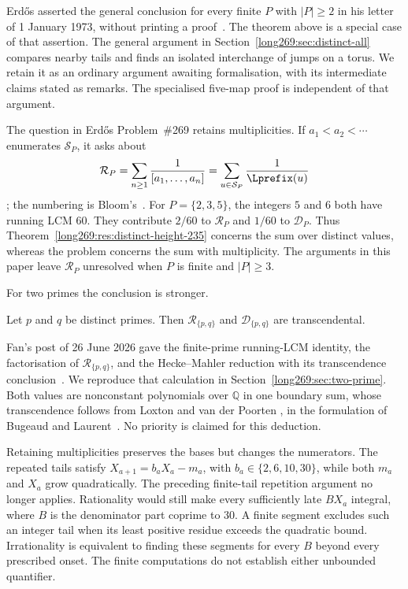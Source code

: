 Erd\H{o}s asserted the general conclusion for every finite $P$ with
$|P|\ge2$ in his letter of 1 January 1973, without printing a
proof~\cite[p.~335]{erdos1974letter}. The theorem above is a special case
of that assertion. The general argument in
Section~\ref{long269:sec:distinct-all} compares nearby tails and finds an
isolated interchange of jumps on a torus. We retain it as an ordinary
argument awaiting formalisation, with its intermediate claims stated as
remarks. The specialised five-map proof is independent of that argument.

The question in Erd\H{o}s Problem~\#269 retains multiplicities. If
$a_1<a_2<\cdots$ enumerates $\mathcal S_P$, it asks about
\[
 \mathcal R_P=\sum_{n\ge1}\frac1{[a_1,\ldots,a_n]}
             =\sum_{u\in\mathcal S_P}\frac1{\Lprefix(u)}
\]
\cite[p.~65]{erdosgraham1980}\cite[p.~106]{erdos1988}; the numbering is
Bloom's~\cite{erdosproblems}. For $P=\{2,3,5\}$, the integers $5$ and $6$
both have running LCM $60$. They contribute $2/60$ to $\mathcal R_P$ and
$1/60$ to $\mathcal D_P$. Thus Theorem~\ref{long269:res:distinct-height-235}
concerns the sum over distinct values, whereas the problem concerns
the sum with multiplicity. The arguments in this paper leave
$\mathcal R_P$ unresolved when $P$ is finite and $|P|\ge3$.

For two primes the conclusion is stronger.

\begin{theorem}\label{long269:res:lead-two-prime}
Let $p$ and $q$ be distinct primes.  Then $\mathcal R_{\{p,q\}}$ and
$\mathcal D_{\{p,q\}}$ are transcendental.
\end{theorem}

Fan's post of 26 June 2026 gave the finite-prime running-LCM identity,
the factorisation of $\mathcal R_{\{p,q\}}$, and the Hecke--Mahler reduction
with its transcendence conclusion~\cite{fan2026comment}. We reproduce that
calculation in Section~\ref{long269:sec:two-prime}. Both values are
nonconstant polynomials over $\mathbb Q$ in one boundary sum, whose
transcendence follows from Loxton and van der Poorten
\cite[Theorem~8, p.~40]{loxtonvdp1977}, in the formulation of Bugeaud and
Laurent~\cite[Theorem~1.1]{bugeaudlaurent2023}. No priority is claimed for
this deduction.

Retaining multiplicities preserves the bases but changes the numerators.
The repeated tails satisfy $X_{a+1}=b_aX_a-m_a$, with
$b_a\in\{2,6,10,30\}$, while both $m_a$ and $X_a$ grow quadratically.
The preceding finite-tail repetition argument no longer applies. Rationality would
still make every sufficiently late $BX_a$ integral, where $B$ is the
denominator part coprime to $30$. A finite segment excludes such an
integer tail when its least positive residue exceeds the quadratic
bound. Irrationality is equivalent to finding these segments for every
$B$ beyond every prescribed onset. The finite computations do not
establish either unbounded quantifier.

